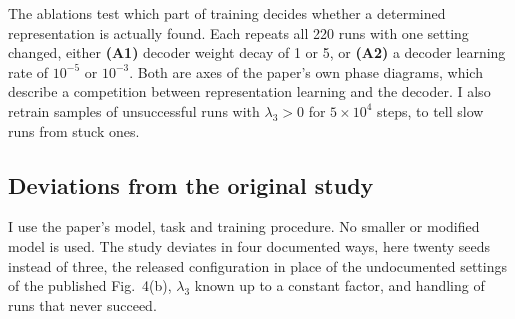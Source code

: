 The ablations test which part of training decides whether a determined
representation is actually found. Each repeats all 220 runs with one setting
changed, either \textbf{(A1)} decoder weight decay of 1 or 5, or \textbf{(A2)} a
decoder learning rate of $10^{-5}$ or $10^{-3}$. Both are axes of the paper's
own phase diagrams, which describe a competition between representation
learning and the decoder. I also retrain samples of unsuccessful runs with $\lambda_3 > 0$ for $5 \times 10^4$ steps, to tell slow runs from stuck ones.

\subsection{Deviations from the original study}
\label{sec:deviations}

I use the paper's model, task and training procedure. No smaller or
modified model is used. The study deviates in four documented ways, here twenty seeds
instead of three, the released configuration in place of the
undocumented settings of the published Fig.~4(b), $\lambda_3$ known up
to a constant factor, and handling of runs that never succeed.
